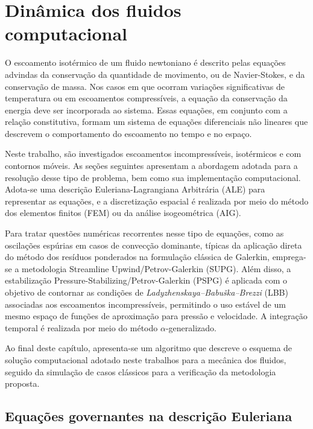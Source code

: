 \chapter[Dinâmica dos fluidos computacional]{Dinâmica dos fluidos computacional}
\label{capitulo:Cap2}

O escoamento isotérmico de um fluido newtoniano é descrito pelas equações advindas da conservação da quantidade de movimento, ou de Navier-Stokes, e da conservação de massa. Nos casos em que ocorram variações significativas de temperatura ou em escoamentos compressíveis, a equação da conservação da energia deve ser incorporada ao sistema. Essas equações, em conjunto com a relação constitutiva, formam um sistema de equações diferenciais não lineares que descrevem o comportamento do escoamento no tempo e no espaço. 

Neste trabalho, são investigados escoamentos incompressíveis, isotérmicos e com contornos móveis. As seções seguintes apresentam a abordagem adotada para a resolução desse tipo de problema, bem como sua implementação computacional. Adota-se uma descrição Euleriana-Lagrangiana Arbitrária (ALE) para representar as equações, e a discretização espacial é realizada por meio do método dos elementos finitos (FEM) ou da análise isogeométrica (AIG).

Para tratar questões numéricas recorrentes nesse tipo de equações, como as oscilações espúrias em casos de convecção dominante, típicas da aplicação direta do método dos resíduos ponderados na formulação clássica de Galerkin, emprega-se a metodologia Streamline Upwind/Petrov-Galerkin (SUPG). Além disso, a estabilização Pressure-Stabilizing/Petrov-Galerkin (PSPG) é aplicada com o objetivo de contornar as condições de \textit{Ladyzhenskaya–Babuška–Brezzi} (LBB) associadas aos escoamentos incompressíveis, permitindo o uso estável de um mesmo espaço de funções de aproximação para pressão e velocidade. A integração temporal é realizada por meio do método $\alpha$-generalizado.

Ao final deste capítulo, apresenta-se um algoritmo que descreve o esquema de solução computacional adotado neste trabalhos para a mecânica dos fluidos, seguido da simulação de casos clássicos para a verificação da metodologia proposta.

\section{Equações governantes na descrição Euleriana} 

